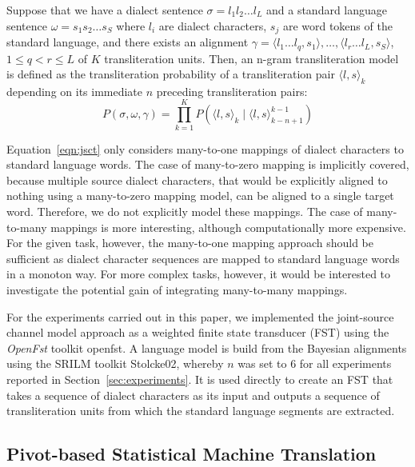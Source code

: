 \documentclass[english]{jnlp_1.4}
\renewcommand{\shortcite}{}
\begin{document}
 Suppose that we have a dialect sentence $\sigma=l_{1}l_{2} \ldots l_{L}$ and a standard language sentence
 $\omega=s_{1}s_{2} \ldots s_{S}$ where $l_{i}$ are dialect characters, $s_{j}$ are word tokens of the standard language,
 and there exists an alignment $\gamma= \langle l_{1} \ldots l_{q}, s_{1}\rangle ,\ldots,\langle l_{r} \ldots l_{L}, s_{S}\rangle$,
 $1 \le q < r \le L$ of $K$ transliteration units.
 Then, an n-gram transliteration model is defined as the transliteration probability of a transliteration pair $\langle l,s\rangle_{k}$
 depending on its immediate $n$ preceding transliteration pairs:
\begin{equation}
    P(\sigma,\omega,\gamma) = \prod^{K}_{k=1} P(\langle l,s\rangle_{k} \mid \langle l,s\rangle^{k-1}_{k-n+1} )
   \label{eqn:jsct}
\end{equation}

 Equation~\ref{eqn:jsct} only considers many-to-one mappings of dialect characters to standard language words.
 The case of many-to-zero mapping is implicitly covered, because multiple source dialect characters,
 that would be explicitly aligned to nothing using a many-to-zero mapping model,
 can be aligned to a single target word. Therefore, we do not explicitly model these mappings.
 The case of many-to-many mappings is more interesting, although computationally
 more expensive. For the given task, however, the many-to-one mapping approach should
 be sufficient as dialect character sequences are mapped to standard language words in a monoton way.
 For more complex tasks, however, it would be interested to investigate the potential gain of
 integrating many-to-many mappings.

 For the experiments carried out in this paper, we implemented the joint-source channel model approach as
 a weighted finite state transducer (FST) using the {\em OpenFst} toolkit \shortcite{openfst}.
 A language model is build from the Bayesian alignments using the SRILM toolkit \shortcite{Stolcke02},
 whereby $n$ was set to 6 for all experiments reported in Section~\ref{sec:experiments}.
 It is used directly to create an FST that takes a sequence of dialect characters as its input
 and outputs a sequence of transliteration units from which the standard language segments are extracted.



\subsection{Pivot-based Statistical Machine Translation}
\label{sec:dialect:pivot}
\end{document}
